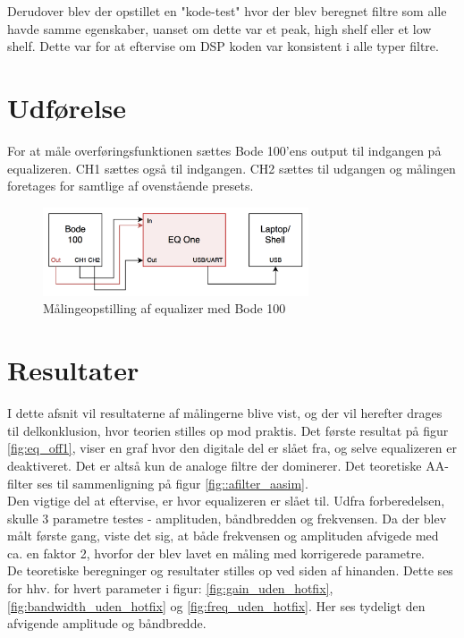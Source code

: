 Derudover blev der opstillet en "kode-test" hvor der blev beregnet filtre som alle havde samme egenskaber, uanset om dette var et peak, high shelf eller et low shelf. Dette var for at eftervise om DSP koden var konsistent i alle typer filtre. \\

\section{Udførelse}
For at måle overføringsfunktionen sættes Bode 100'ens output til indgangen på equalizeren. CH1 sættes også til indgangen. CH2 sættes til udgangen og målingen foretages for samtlige af ovenstående presets. \\


\begin{figure}[h!]\label{fig:bode_setup}
	\centering
	\includegraphics[width=0.7\textwidth]{billeder/bode_setup}
	\caption{Målingeopstilling af equalizer med Bode 100}
\end{figure}	

\FloatBlock

\section{Resultater}
I dette afsnit vil resultaterne af målingerne blive vist, og der vil herefter drages til delkonklusion, hvor teorien stilles op mod praktis.
Det første resultat på figur \ref{fig:eq_off1}, viser en graf hvor den digitale del er slået fra, og selve equalizeren er deaktiveret. Det er altså kun de analoge filtre der dominerer. Det teoretiske AA-filter ses til sammenligning på figur \ref{fig::afilter_aasim}. \\
Den vigtige del at eftervise, er hvor equalizeren er slået til. 
Udfra forberedelsen, skulle 3 parametre testes - amplituden, båndbredden og frekvensen. 
Da der blev målt første gang, viste det sig, at både frekvensen og amplituden afvigede med ca. en faktor 2, hvorfor der blev lavet en måling med korrigerede parametre. \\

De teoretiske beregninger og resultater stilles op ved siden af hinanden.
Dette ses for hhv. for hvert parameter i figur: \ref{fig:gain_uden_hotfix}, \ref{fig:bandwidth_uden_hotfix} og \ref{fig:freq_uden_hotfix}. 
Her ses tydeligt den afvigende amplitude og båndbredde.


